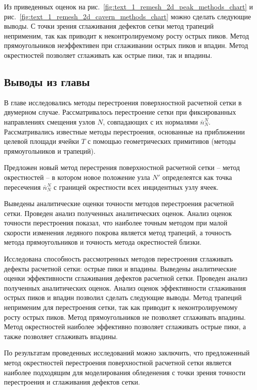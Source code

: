 Из приведенных оценок на рис.~\ref{fig:text_1_remesh_2d_peak_methods_chart} и рис.~\ref{fig:text_1_remesh_2d_cavern_methods_chart} можно сделать следующие выводы.
С точки зрения сглаживания дефектов сетки метод трапеций неприменим, так как приводит к неконтролируемому росту острых пиков.
Метод прямоугольников неэффективен при сглаживании острых пиков и впадин.
Метод окрестностей позволяет сглаживать как острые пики, так и впадины.


\subsection{Выводы из главы}

В главе исследовались методы перестроения поверхностной расчетной сетки в двумерном случае.
Рассматривалось перестроение сетки при фиксированных направлениях смещения узлов $N$, совпадающих с их нормалями $\overline{n}_{N}^N$.
Рассматривались известные методы перестроения, основанные на приближении целевой площади ячейки $T$ с помощью геометрических примитивов (методы прямоугольников и трапеций).

Предложен новый метод перестрения поверхностной расчетной сетки -- метод окрестностей -- в котором новое положение узла $N'$ определеятся как точка пересечения $\overline{n}_{N}^N$ с границей окрестности всех инцидентных узлу ячеек.

Выведены аналитические оценки точности методов перестроения расчетной сетки.
Проведен анализ полученных аналитических оценок.
Анализ оценок точности перестроения показал, что наиболее точным методом при малой скорости изменения ледяного покрова является метод трапеций, а точность метода прямоугольников и точность метода окрестностей близки.

Исследована способность рассмотренных методов перестроения сглаживать дефекты расчетной сетки: острые пики и впадины.
Выведены аналитические оценки эффективности сглаживания дефектов расчетной сетки.
Проведен анализ полученных аналитических оценок.
Анализ оценок эффективности сглаживания острых пиков и впадин позволил сделать следующие выводы.
Метод трапеций неприменим для перестроения сетки, так как приводит к неконтролируемому росту острых пиков.
Метод прямоугольников не позволяет сглаживать впадины.
Метод окрестностей наиболее эффективно позволяет сглаживать острые пики, а также позволяет сглаживать впадины.

По результатам проведенных исследований можно заключить, что предложенный метод окрестностей перестроения поверхностной расчетной сетки является наиболее подходящим для моделирования обледенения с точки зрения точности перестроения и сглаживания дефектов сетки.

